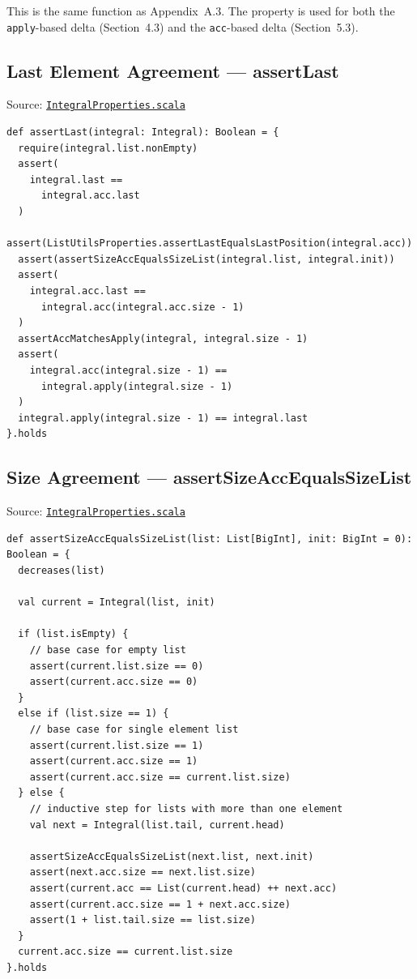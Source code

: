 This is the same function as Appendix~A.3. The property is used for both
the \texttt{apply}-based delta (Section~4.3) and the \texttt{acc}-based
delta (Section~5.3).

\subsection{Last Element Agreement --- assertLast}

Source:
\href{https://github.com/thiagomata/prime-numbers/blob/master/src/main/scala/v1/chapter3/list/integral/properties/IntegralProperties.scala}{\texttt{IntegralProperties.scala}}

\begin{lstlisting}[style=scala]
def assertLast(integral: Integral): Boolean = {
  require(integral.list.nonEmpty)
  assert(
    integral.last ==
      integral.acc.last
  )
  assert(ListUtilsProperties.assertLastEqualsLastPosition(integral.acc))
  assert(assertSizeAccEqualsSizeList(integral.list, integral.init))
  assert(
    integral.acc.last ==
      integral.acc(integral.acc.size - 1)
  )
  assertAccMatchesApply(integral, integral.size - 1)
  assert(
    integral.acc(integral.size - 1) ==
      integral.apply(integral.size - 1)
  )
  integral.apply(integral.size - 1) == integral.last
}.holds
\end{lstlisting}

\subsection{Size Agreement --- assertSizeAccEqualsSizeList}

Source:
\href{https://github.com/thiagomata/prime-numbers/blob/master/src/main/scala/v1/chapter3/list/integral/properties/IntegralProperties.scala}{\texttt{IntegralProperties.scala}}

\begin{lstlisting}[style=scala]
def assertSizeAccEqualsSizeList(list: List[BigInt], init: BigInt = 0): Boolean = {
  decreases(list)

  val current = Integral(list, init)

  if (list.isEmpty) {
    // base case for empty list
    assert(current.list.size == 0)
    assert(current.acc.size == 0)
  }
  else if (list.size == 1) {
    // base case for single element list
    assert(current.list.size == 1)
    assert(current.acc.size == 1)
    assert(current.acc.size == current.list.size)
  } else {
    // inductive step for lists with more than one element
    val next = Integral(list.tail, current.head)

    assertSizeAccEqualsSizeList(next.list, next.init)
    assert(next.acc.size == next.list.size)
    assert(current.acc == List(current.head) ++ next.acc)
    assert(current.acc.size == 1 + next.acc.size)
    assert(1 + list.tail.size == list.size)
  }
  current.acc.size == current.list.size
}.holds
\end{lstlisting}

